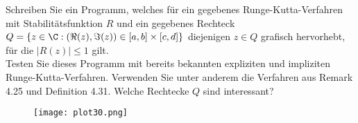 \begin{exercise}
Schreiben Sie ein Programm, welches für ein gegebenes Runge-Kutta-Verfahren
mit Stabilitätsfunktion $R$ und ein gegebenes Rechteck $Q = \{ z \in \C:
(\Re(z),\Im(z)) \in [a,b] \times [c,d]\}$ diejenigen $z \in Q$ grafisch
hervorhebt, für die $|R(z)| \leq 1$ gilt. \\
Testen Sie dieses Programm mit bereits bekannten expliziten und impliziten
Runge-Kutta-Verfahren. Verwenden Sie unter anderem die Verfahren aus Remark 4.25
und Definition 4.31. Welche Rechtecke $Q$ sind interessant?
\end{exercise}
\begin{solution}
\begin{figure}
    \centering
    \texttt{[image: plot30.png]}
\end{figure}
\end{solution}
